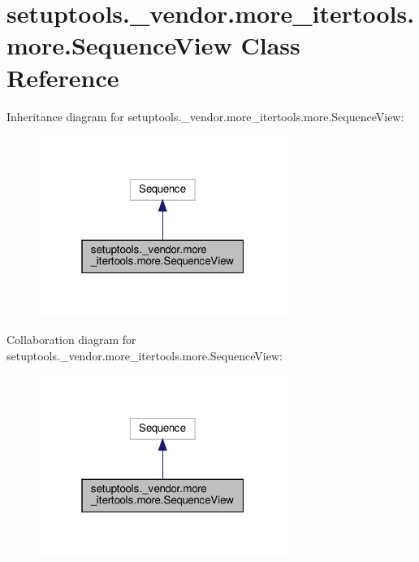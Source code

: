 \hypertarget{classsetuptools_1_1__vendor_1_1more__itertools_1_1more_1_1SequenceView}{}\section{setuptools.\+\_\+vendor.\+more\+\_\+itertools.\+more.\+Sequence\+View Class Reference}
\label{classsetuptools_1_1__vendor_1_1more__itertools_1_1more_1_1SequenceView}


Inheritance diagram for setuptools.\+\_\+vendor.\+more\+\_\+itertools.\+more.\+Sequence\+View\+:
\nopagebreak
\begin{figure}[H]
\begin{center}
\leavevmode
\includegraphics[width=229pt]{classsetuptools_1_1__vendor_1_1more__itertools_1_1more_1_1SequenceView__inherit__graph}
\end{center}
\end{figure}


Collaboration diagram for setuptools.\+\_\+vendor.\+more\+\_\+itertools.\+more.\+Sequence\+View\+:
\nopagebreak
\begin{figure}[H]
\begin{center}
\leavevmode
\includegraphics[width=229pt]{classsetuptools_1_1__vendor_1_1more__itertools_1_1more_1_1SequenceView__coll__graph}
\end{center}
\end{figure}
